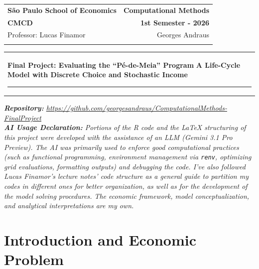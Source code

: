 \documentclass[11pt]{article}
\numberwithin{equation}{section}
\numberwithin{figure}{section}
\begin{document}
\thispagestyle{empty}

\begin{tabular}{p{9.8cm}p{9cm}}
{\large \bf São Paulo School of Economics} & \multicolumn{1}{r}{\large \bf Computational Methods}\\ 
\large{\bf CMCD} & \multicolumn{1}{r}{\large \bf 1st Semester - 2026}\\ 
\large Professor: Lucas Finamor & \multicolumn{1}{r}{\large Georges Andraus} 
\\
\vspace{0.3cm}
\\
\end{tabular}

\begin{tabular}{p{15.5cm}}
\hline
\vspace{-0.3cm}
\center \Large{\textbf{Final Project: Evaluating the ``Pé-de-Meia'' Program}} 
\vspace{0.1cm}
\center \large{\textbf{A Life-Cycle Model with Discrete Choice and Stochastic Income}} 
\vspace{0.4cm}
\hrule
\vspace{0.55cm}
\end{tabular}

\vspace{1cm}

\noindent\textit{\textbf{Repository:} \url{https://github.com/georgesandraus/ComputationalMethods-FinalProject}}
\\

\noindent\textit{\textbf{AI Usage Declaration:} Portions of the R code and the LaTeX structuring of this project were developed with the assistance of an LLM (Gemini 3.1 Pro Preview). The AI was primarily used to enforce good computational practices (such as functional programming, environment management via \texttt{renv}, optimizing grid evaluations, formatting outputs) and debugging the code. I've also followed Lucas Finamor's lecture notes' code structure as a general guide to partition my codes in different ones for better organization, as well as for the development of the model solving procedures. The economic framework, model conceptualization, and analytical interpretations are my own.}
\vspace{-0.3cm}

\section{Introduction and Economic Problem}
\end{document}
